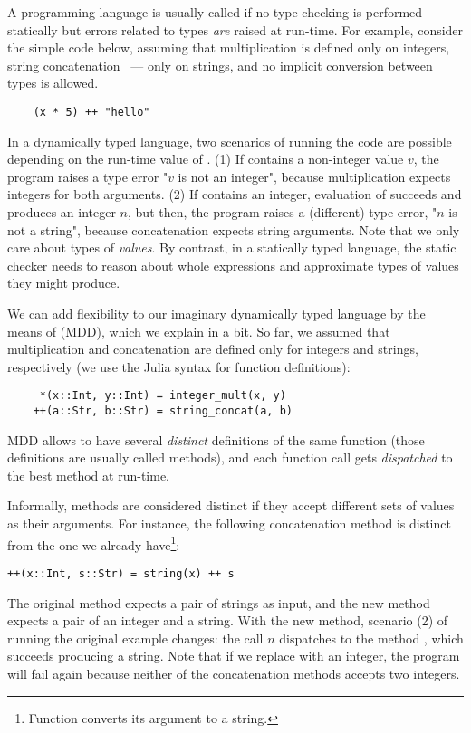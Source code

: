 A programming language is usually called 
if no type checking is performed statically
but errors related to types \emph{are} raised at run-time.
For example, consider the simple code below, assuming that
multiplication \jlcode{(*)} is defined only on integers, 
string concatenation \jlcode{(++)}~--- only on strings,
and no implicit conversion between types is allowed.
\begin{verbatim}
    (x * 5) ++ "hello"
\end{verbatim}
In a dynamically typed language, two scenarios of running the code are possible
depending on the run-time value of .
(1) If  contains a non-integer value $v$, 
the program raises a type error "$v$ is not an integer",
because multiplication expects integers for both arguments.
(2) If  contains an integer,
evaluation of  succeeds and produces an integer $n$,
but then, the program raises a (different) type error, "$n$ is not a string", 
because concatenation expects string arguments.
Note that we only care about %
types of \emph{values}. By contrast, in a statically typed language,
the static checker needs to reason about whole expressions and approximate
types of values they might produce.

We can add flexibility to our imaginary dynamically typed language
by the means of  (MDD), 
which we explain in a bit.
So far, we assumed that multiplication and concatenation are defined only
for integers and strings, respectively
(we use the Julia syntax for function definitions):
\begin{verbatim}
     *(x::Int, y::Int) = integer_mult(x, y)
    ++(a::Str, b::Str) = string_concat(a, b)
\end{verbatim}
MDD allows to have several \emph{distinct} definitions of the same function
(those definitions are usually called methods),
and each function call gets \emph{dispatched} to the best method at run-time.

Informally, methods are considered distinct if they accept different sets 
of values as their arguments. For instance, the following concatenation method
is distinct from the one we already have\footnote{Function 
	 converts its argument to a string.}:
\begin{verbatim}
++(x::Int, s::Str) = string(x) ++ s
\end{verbatim}
The original method expects a pair of strings as input, and the new method
expects a pair of an integer and a string.
With the new method, scenario (2) of running the original example changes:
the call $n$ dispatches to the method
, which succeeds producing a string.
Note that if we replace  with an integer, the program will fail
again because neither of the concatenation methods accepts two integers.

